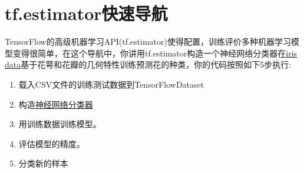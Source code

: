 \section{tf.estimator快速导航}
TensorFlow的高级机器学习API(tf.estimator)使得配置，训练评价多种机器学习模型变得很简单，在这个导航中，你讲用tf.estimator构造一个神经网络分类器在\href{https://en.wikipedia.org/wiki/Iris_flower_data_set}{iris data}基于花萼和花瓣的几何特性训练预测花的种类，你的代码按照如下5步执行:
\begin{enumerate}
	\item 载入CSV文件的训练测试数据到TensorFlowDataset
	\item 构造\href{https://www.tensorflow.org/api_docs/python/tf/estimator/DNNClassifier}{神经网络分类器}
	\item 用训练数据训练模型。
	\item 评估模型的精度。
	\item 分类新的样本
\end{enumerate}
